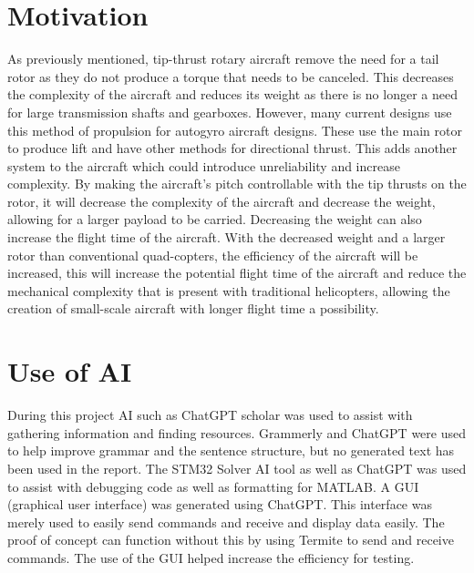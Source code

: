 \section{Motivation}
    As previously mentioned, tip-thrust rotary aircraft remove the need for a tail rotor as they do not produce a torque that needs to be canceled. This decreases the complexity of the aircraft and reduces its weight as there is no longer a need for large transmission shafts and gearboxes. However, many current designs use this method of propulsion for autogyro aircraft designs. These use the main rotor to produce lift and have other methods for directional thrust. This adds another system to the aircraft which could introduce unreliability and increase complexity. By making the aircraft's pitch controllable with the tip thrusts on the rotor, it will decrease the complexity of the aircraft and decrease the weight, allowing for a larger payload to be carried. Decreasing the weight can also increase the flight time of the aircraft. With the decreased weight and a larger rotor than conventional quad-copters, the efficiency of the aircraft will be increased, this will increase the potential flight time of the aircraft and reduce the mechanical complexity that is present with traditional helicopters, allowing the creation of small-scale aircraft with longer flight time a possibility. 
    
\section{Use of AI}
    During this project AI such as ChatGPT scholar was used to assist with gathering information and finding resources. Grammerly and ChatGPT were used to help improve grammar and the sentence structure, but no generated text has been used in the report. The STM32 Solver AI tool as well as ChatGPT was used to assist with debugging code as well as formatting for  MATLAB. A GUI (graphical user interface) was generated using ChatGPT. This interface was merely used to easily send commands and receive and display data easily. The proof of concept can function without this by using Termite to send and receive commands. The use of the GUI helped increase the efficiency for testing.  
    
